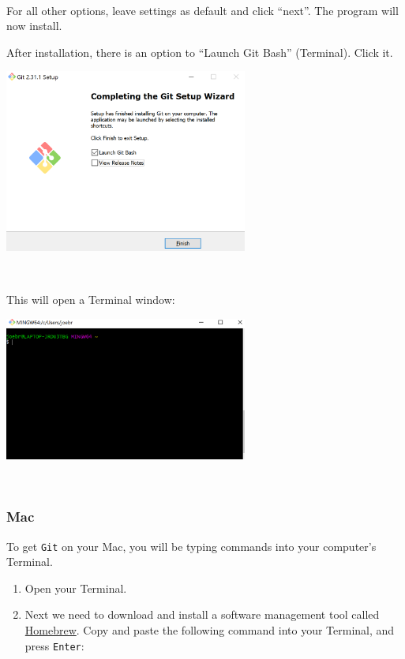 \documentclass[
]{book}
\begin{document}
~

For all other options, leave settings as default and click ``next''. The program will now install.

After installation, there is an option to ``Launch Git Bash'' (Terminal). Click it.

\includegraphics[width=0.6\textwidth,height=\textheight]{img/git3.png}

~

This will open a Terminal window:

\includegraphics[width=0.6\textwidth,height=\textheight]{img/git4.png}

~

\hypertarget{mac}{%
\subsubsection*{Mac}\label{mac}}

To get \texttt{Git} on your Mac, you will be typing commands into your computer's Terminal.

\begin{enumerate}
\def\labelenumi{\arabic{enumi}.}
\item
  Open your Terminal.
\item
  Next we need to download and install a software management tool called \href{brew.sh}{Homebrew}. Copy and paste the following command into your Terminal, and press \texttt{Enter}:
\end{enumerate}
\end{document}
